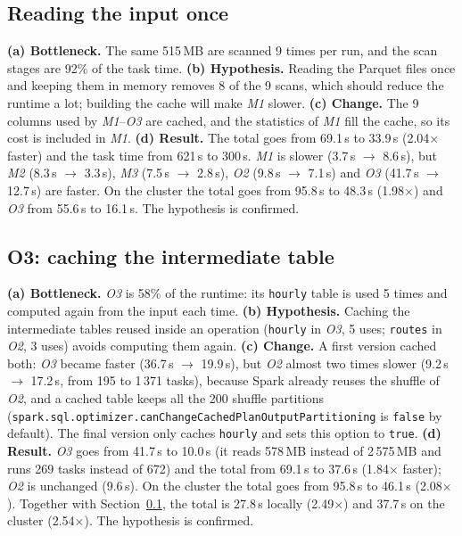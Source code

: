 \documentclass[10pt,a4paper]{article}
\begin{document}
\subsection{Reading the input once} \label{opt:cache}
\textbf{(a) Bottleneck.} The same 515\,MB are scanned 9 times per run, and the scan stages are 92\% of the task time.
\textbf{(b) Hypothesis.} Reading the Parquet files once and keeping them in memory removes 8 of the 9 scans, which should reduce the runtime a lot; building the cache will make \textit{M1} slower.
\textbf{(c) Change.} The 9 columns used by \textit{M1}--\textit{O3} are cached, and the statistics of \textit{M1} fill the cache, so its cost is included in \textit{M1}.
\textbf{(d) Result.} The total goes from 69.1\,s to 33.9\,s (2.04$\times$ faster) and the task time from 621\,s to 300\,s. \textit{M1} is slower (3.7\,s $\rightarrow$ 8.6\,s), but \textit{M2} (8.3\,s $\rightarrow$ 3.3\,s), \textit{M3} (7.5\,s $\rightarrow$ 2.8\,s), \textit{O2} (9.8\,s $\rightarrow$ 7.1\,s) and \textit{O3} (41.7\,s $\rightarrow$ 12.7\,s) are faster. On the cluster the total goes from 95.8\,s to 48.3\,s (1.98$\times$) and \textit{O3} from 55.6\,s to 16.1\,s. The hypothesis is confirmed.

\subsection{O3: caching the intermediate table}
\textbf{(a) Bottleneck.} \textit{O3} is 58\% of the runtime: its \texttt{hourly} table is used 5 times and computed again from the input each time.
\textbf{(b) Hypothesis.} Caching the intermediate tables reused inside an operation (\texttt{hourly} in \textit{O3}, 5 uses; \texttt{routes} in \textit{O2}, 3 uses) avoids computing them again.
\textbf{(c) Change.} A first version cached both: \textit{O3} became faster (36.7\,s $\rightarrow$ 19.9\,s), but \textit{O2} almost two times slower (9.2\,s $\rightarrow$ 17.2\,s, from 195 to 1\,371 tasks), because Spark already reuses the shuffle of \textit{O2}, and a cached table keeps all the 200 shuffle partitions (\texttt{spark.sql.optimizer.canChangeCachedPlanOutputPartitioning} is \texttt{false} by default). The final version only caches \texttt{hourly} and sets this option to \texttt{true}.
\textbf{(d) Result.} \textit{O3} goes from 41.7\,s to 10.0\,s (it reads 578\,MB instead of 2\,575\,MB and runs 269 tasks instead of 672) and the total from 69.1\,s to 37.6\,s (1.84$\times$ faster); \textit{O2} is unchanged (9.6\,s). On the cluster the total goes from 95.8\,s to 46.1\,s (2.08$\times$). Together with Section~\ref{opt:cache}, the total is 27.8\,s locally (2.49$\times$) and 37.7\,s on the cluster (2.54$\times$). The hypothesis is confirmed.
\end{document}
